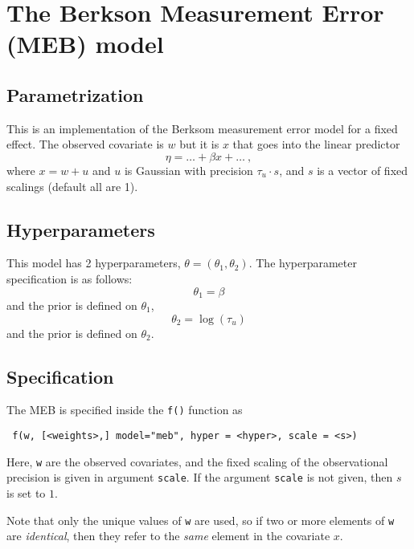 \documentclass[a4paper,11pt]{article}
\begin{document}
\section*{The Berkson Measurement Error (MEB) model}

\subsection*{Parametrization}

This is an implementation of the Berksom measurement error model for a
fixed effect. The observed covariate is $w$ but it is $x$
that goes into the linear predictor
\begin{displaymath}
    \eta = \ldots + \beta x + \ldots \ ,
\end{displaymath}
where $x = w + u$ and $u$ is Gaussian
with precision $\tau_u\cdot  s$,
 and $s$ is a vector of fixed scalings (default all are 1).



\subsection*{Hyperparameters}

This model has 2 hyperparameters, $\theta = (\theta_{1}, \theta_{2})$.
The hyperparameter specification is as follows:
\begin{displaymath}
    \theta_{1} = \beta
\end{displaymath}
and the prior is defined on $\theta_{1}$,
\begin{displaymath}
    \theta_{2} = \log(\tau_u)
\end{displaymath}
and the prior is defined on $\theta_{2}$.

\subsection*{Specification}

The MEB is specified inside the {\tt f()}
function as
\begin{verbatim}
 f(w, [<weights>,] model="meb", hyper = <hyper>, scale = <s>)
\end{verbatim}
Here, \texttt{w} are the observed covariates, and the fixed scaling of
the observational precision is given in argument \texttt{scale}. If
the argument \texttt{scale} is not given, then $s$ is set to $1$.

Note that only the unique values of \texttt{w} are used, so if two or
more elements of \texttt{w} are \emph{identical}, then they refer to
the \emph{same} element in the covariate $x$.
\end{document}
